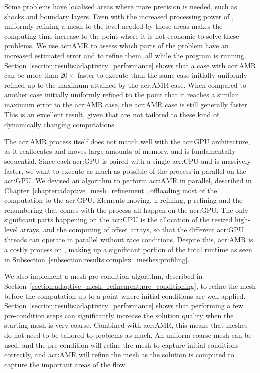 Some problems have localised areas where more precision is needed, such as shocks and boundary
layers. Even with the increased processing power of , uniformly refining a mesh
to the level needed by those areas makes the computing time increase to the point where it is not
economic to solve these problems. We use \acrlong{acr:AMR} to assess which parts of the problem have
an increased estimated error and to refine them, all while the program is running.
Section~\ref{section:results:adaptivity_performance} shows that a case with \acrshort{acr:AMR} can
be more than \(20 \times \) faster to execute than the same case initially uniformly refined up to
the maximum attained by the \acrshort{acr:AMR} case. When compared to another case initially
uniformly refined to the point that it reaches a similar maximum error to the \acrshort{acr:AMR}
case, the \acrshort{acr:AMR} case is still generally faster. This is an excellent result, given that
 are not tailored to these kind of dynamically changing computations. 

The \acrshort{acr:AMR} process itself does not match well with the \acrshort{acr:GPU} architecture,
as it reallocates and moves large amounts of memory, and is fundamentally sequential. Since each
\acrshort{acr:GPU} is paired with a single \acrshort{acr:CPU} and is massively faster, we want to
execute as much as possible of the process in parallel on the \acrshort{acr:GPU}. We devised an
algorithm to perform \acrshort{acr:AMR} in parallel, described in
Chapter~\ref{chapter:adaptive_mesh_refinement}, offloading most of the computation to the
\acrshort{acr:GPU}. Elements moving, h-refining, p-refining and the renumbering that comes with the
process all happen on the \acrshort{acr:GPU}. The only significant parts happening on the
\acrshort{acr:CPU} is the allocation of the resized high-level arrays, and the computing of offset
arrays, so that the different \acrshort{acr:GPU} threads can operate in parallel without race
conditions. Despite this, \acrshort{acr:AMR} is a costly process on , making up
a significant portion of the total runtime as seen in
Subsection~\ref{subsection:results:complex_meshes:profiling}.

We also implement a mesh pre-condition algorithm, described in
Section~\ref{section:adaptive_mesh_refinement:pre_conditioning}, to refine the mesh before the
computation up to a point where initial conditions are well applied.
Section~\ref{section:results:adaptivity_performance} shows that performing a few pre-condition steps
can significantly increase the solution quality when the starting mesh is very coarse. Combined with
\acrshort{acr:AMR}, this means that meshes do not need to be tailored to problems as much. An
uniform coarse mesh can be used, and the pre-condition will refine the mesh to capture initial
conditions correctly, and \acrshort{acr:AMR} will refine the mesh as the solution is computed to
capture the important areas of the flow.

